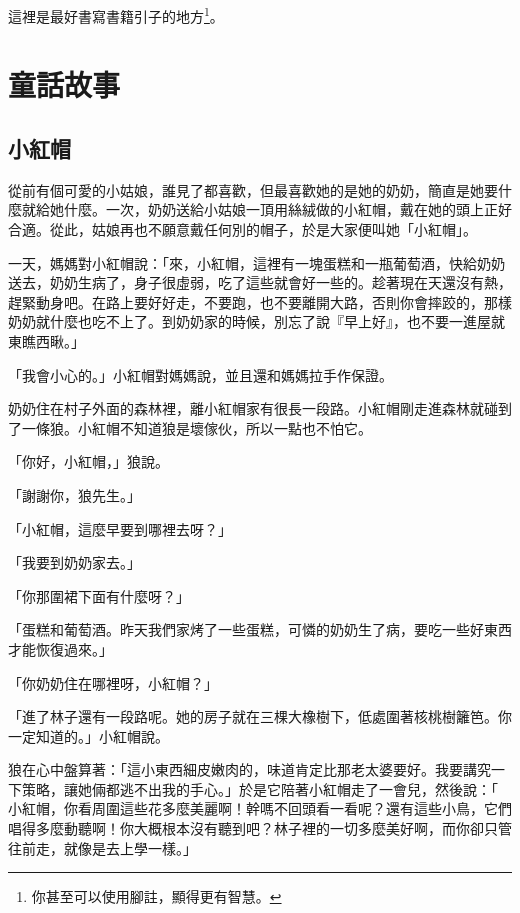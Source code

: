 \documentclass[oneside,10pt]{memoir} %
\begin{document}
這裡是最好書寫書籍引子的地方\footnote{你甚至可以使用腳註，顯得更有智慧。}。


\part{童話故事}


\chapter{小紅帽}

從前有個可愛的小姑娘，誰見了都喜歡，但最喜歡她的是她的奶奶，簡直是她要什
麼就給她什麼。一次，奶奶送給小姑娘一頂用絲絨做的小紅帽，戴在她的頭上正好
合適。從此，姑娘再也不願意戴任何別的帽子，於是大家便叫她「小紅帽」。

一天，媽媽對小紅帽說：「來，小紅帽，這裡有一塊蛋糕和一瓶葡萄酒，快給奶奶
送去，奶奶生病了，身子很虛弱，吃了這些就會好一些的。趁著現在天還沒有熱，
趕緊動身吧。在路上要好好走，不要跑，也不要離開大路，否則你會摔跤的，那樣
奶奶就什麼也吃不上了。到奶奶家的時候，別忘了說『早上好』，也不要一進屋就
東瞧西瞅。」

「我會小心的。」小紅帽對媽媽說，並且還和媽媽拉手作保證。

奶奶住在村子外面的森林裡，離小紅帽家有很長一段路。小紅帽剛走進森林就碰到
了一條狼。小紅帽不知道狼是壞傢伙，所以一點也不怕它。

「你好，小紅帽，」狼說。

「謝謝你，狼先生。」

「小紅帽，這麼早要到哪裡去呀？」

「我要到奶奶家去。」

「你那圍裙下面有什麼呀？」

「蛋糕和葡萄酒。昨天我們家烤了一些蛋糕，可憐的奶奶生了病，要吃一些好東西
才能恢復過來。」

「你奶奶住在哪裡呀，小紅帽？」

「進了林子還有一段路呢。她的房子就在三棵大橡樹下，低處圍著核桃樹籬笆。你
一定知道的。」小紅帽說。

狼在心中盤算著：「這小東西細皮嫩肉的，味道肯定比那老太婆要好。我要講究一
下策略，讓她倆都逃不出我的手心。」於是它陪著小紅帽走了一會兒，然後說：「
小紅帽，你看周圍這些花多麼美麗啊！幹嗎不回頭看一看呢？還有這些小鳥，它們
唱得多麼動聽啊！你大概根本沒有聽到吧？林子裡的一切多麼美好啊，而你卻只管
往前走，就像是去上學一樣。」
\end{document}
